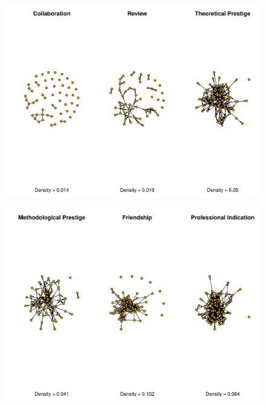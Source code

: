 \documentclass[compress]{beamer}
\begin{document}
\begin{frame}
	\begin{figure}[!ht]
		\centering
		\includegraphics[scale=0.5]{redes1.pdf}
	\end{figure}
\end{frame}

\begin{frame}
	\begin{figure}[!ht]
		\centering
		\includegraphics[scale=0.5]{redes2.pdf}
	\end{figure}
\end{frame}
\end{document}

